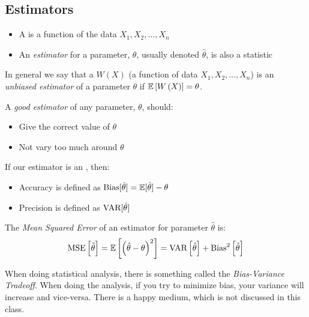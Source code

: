 	\subsection{Estimators} \label{subsec:Estimators}
		\begin{itemize}[noitemsep, nolistsep]
			\item A  is a function of the data $X_{1},X_{2},\ldots,X_{n}$
			\item An \emph{estimator} for a parameter, $\theta$, usually denoted $\hat{\theta}$, is also a statistic
		\end{itemize}
		\begin{definition} \label{def:Unbiased Estimator}
			In general we say that a  $W (X)$ (a function of data $X_{1},X_{2},\ldots,X_{n}$) is an \emph{unbiased estimator} of a parameter $\theta$ if $\operatorname{\mathbb{E}} \left[ W \left( X \right) \right] = \theta$.
			\begin{remark}
				A \emph{good estimator} of any parameter, $\theta$, should:
				\begin{itemize}[noitemsep, nolistsep]
					\item Give the correct value of $\theta$
					\item Not vary too much around $\theta$
				\end{itemize}
			\end{remark}
		\end{definition}
	If our estimator is an , then:
		\begin{itemize}
			\item Accuracy is defined as $\operatorname{\text{Bias}} [\hat{\theta} ] = \operatorname{\mathbb{E}} [\hat{\theta}] - \theta$
			\item Precision is defined as $\operatorname{\text{VAR}} [\hat{\theta}]$
		\end{itemize}
		\begin{definition} \label{def:Mean Squared Error}
			The \emph{Mean Squared Error} of an estimator for parameter $\hat{\theta}$ is:
			\begin{equation} \label{eq:Mean Squared Error}
				\operatorname{\text{MSE}} \left[ \hat{\theta} \right]
				= \operatorname{\mathbb{E}} \left[ \left( \hat{\theta} - \theta \right)^{2} \right]
				= \operatorname{\text{VAR}} \left[ \hat{\theta} \right] + \operatorname{\text{Bias}}^{2} \left[ \hat{\theta} \right]
			\end{equation}
		\end{definition}
		\begin{remark}
			When doing statistical analysis, there is something called the \emph{Bias-Variance Tradeoff}.
			When doing the analysis, if you try to minimize bias, your variance will increase and vice-versa.
			There is a happy medium, which is not discussed in this class.
		\end{remark}